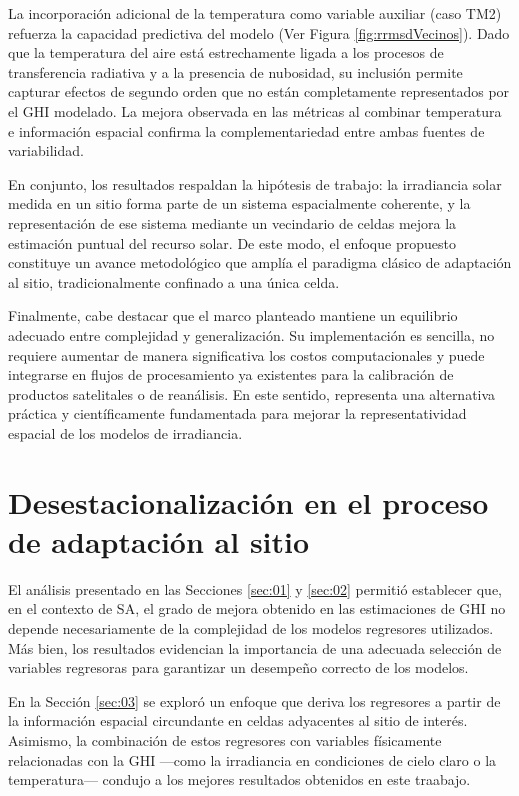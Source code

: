 La incorporación adicional de la temperatura como variable auxiliar (caso TM2) refuerza la capacidad predictiva del modelo (Ver Figura \ref{fig:rrmsdVecinos}). Dado que la temperatura del aire está estrechamente ligada a los procesos de transferencia radiativa y a la presencia de nubosidad, su inclusión permite capturar efectos de segundo orden que no están completamente representados por el GHI modelado. La mejora observada en las métricas al combinar temperatura e información espacial confirma la complementariedad entre ambas fuentes de variabilidad.

En conjunto, los resultados respaldan la hipótesis de trabajo: la irradiancia solar medida en un sitio forma parte de un sistema espacialmente coherente, y la representación de ese sistema mediante un vecindario de celdas mejora la estimación puntual del recurso solar. De este modo, el enfoque propuesto constituye un avance metodológico que amplía el paradigma clásico de adaptación al sitio, tradicionalmente confinado a una única celda.

Finalmente, cabe destacar que el marco planteado mantiene un equilibrio adecuado entre complejidad y generalización. Su implementación es sencilla, no requiere aumentar de manera significativa los costos computacionales y puede integrarse en flujos de procesamiento ya existentes para la calibración de productos satelitales o de reanálisis. En este sentido, representa una alternativa práctica y científicamente fundamentada para mejorar la representatividad espacial de los modelos de irradiancia.



\section{Desestacionalización en el proceso de adaptación al sitio}\label{sec:04}


El análisis presentado en las Secciones \ref{sec:01} y \ref{sec:02} permitió establecer que, en el contexto de SA, el grado de mejora obtenido en las estimaciones de GHI no depende necesariamente de la complejidad de los modelos regresores utilizados. Más bien, los resultados evidencian la importancia de una adecuada selección de variables regresoras para garantizar un desempeño correcto de los modelos.

En la Sección \ref{sec:03} se exploró un enfoque que deriva los regresores a partir de la información espacial circundante en celdas adyacentes al sitio de interés. Asimismo, la combinación de estos regresores con variables físicamente relacionadas con la GHI —como la irradiancia en condiciones de cielo claro o la temperatura— condujo a los mejores resultados obtenidos en este traabajo.

